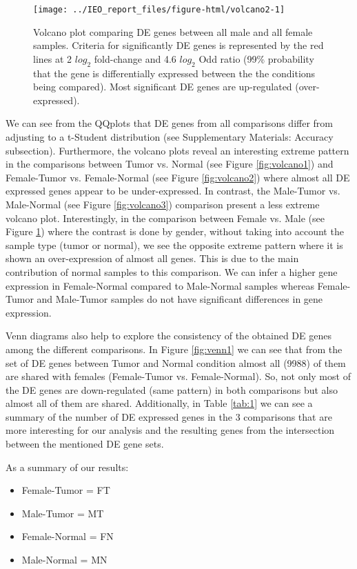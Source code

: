 \documentclass[9pt,twocolumn,twoside]{gsajnl}
\begin{document}
\begin{figure}
\centering
\texttt{[image: ../IEO\_report\_files/figure-html/volcano2-1]}
\caption{Volcano plot comparing DE genes between all male and all female samples. Criteria for significantly DE genes is represented by the red lines at 2 $log_{2}$ fold-change and 4.6 $log_{2}$ Odd ratio (99\% probability that the gene is differentially expressed between the the conditions being compared). Most significant DE genes are up-regulated (over-expressed).}
\label{fig:volcano4}
\end{figure}


We can see from the QQplots that DE genes from all comparisons differ from adjusting to a t-Student distribution (see Supplementary Materials: Accuracy subsection). Furthermore, the volcano plots reveal an interesting extreme pattern in the comparisons between Tumor vs. Normal (see Figure \ref{fig:volcano1}) and Female-Tumor vs. Female-Normal (see Figure \ref{fig:volcano2}) where almost all DE expressed genes appear to be under-expressed. In contrast, the Male-Tumor vs. Male-Normal (see Figure \ref{fig:volcano3}) comparison present a less extreme volcano plot. Interestingly, in the comparison between Female vs. Male (see Figure \ref{fig:volcano4}) where the contrast is done by gender, without taking into account the sample type (tumor or normal), we see the opposite extreme pattern where it is shown an over-expression of almost all genes. This is due to the main contribution of normal samples to this comparison. We can infer a higher gene expression in Female-Normal compared to Male-Normal samples whereas Female-Tumor and Male-Tumor samples do not have significant differences in gene expression. 

Venn diagrams also help to explore the consistency of the obtained DE genes among the different comparisons. In Figure \ref{fig:venn1} we can see that from the set of DE genes between Tumor and Normal condition almost all (9988) of them are shared with females (Female-Tumor vs. Female-Normal). So, not only most of the DE genes are down-regulated (same pattern) in both comparisons but also almost all of them are shared. Additionally, in Table \ref{tab:1} we can see a summary of the number of DE expressed genes in the 3 comparisons that are more interesting for our analysis and the resulting genes from the intersection between the mentioned DE gene sets.


As a summary of our results:
\begin{itemize}
\item Female-Tumor = FT
\item Male-Tumor = MT
\item Female-Normal = FN
\item Male-Normal = MN
\end{itemize}
\end{document}

